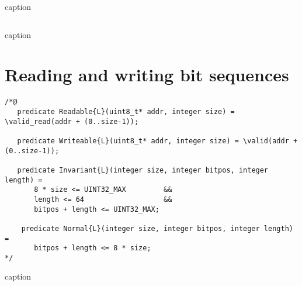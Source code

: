 \begin{listing}[hbt]
\begin{minipage}{0.99\textwidth}
\begin{lstlisting}[style=acsl-block]

\end{lstlisting}
\end{minipage}
\caption{caption}
\end{listing}



\begin{listing}[hbt]
\begin{minipage}{0.99\textwidth}
\begin{lstlisting}[style=acsl-block]

\end{lstlisting}
\end{minipage}
\caption{caption}
\end{listing}











\FloatBarrier

\section{Reading and writing bit sequences}
\label{sec:bit sequences}



\begin{listing}[hbt]
\begin{minipage}{0.99\textwidth}
\begin{lstlisting}[style=acsl-block]
/*@
   predicate Readable{L}(uint8_t* addr, integer size) = \valid_read(addr + (0..size-1));

   predicate Writeable{L}(uint8_t* addr, integer size) = \valid(addr + (0..size-1));

   predicate Invariant{L}(integer size, integer bitpos, integer length) =
       8 * size <= UINT32_MAX         &&
       length <= 64                   &&
       bitpos + length <= UINT32_MAX;

    predicate Normal{L}(integer size, integer bitpos, integer length) =
       bitpos + length <= 8 * size;
*/
\end{lstlisting}
\end{minipage}
\caption{caption}
\end{listing}



